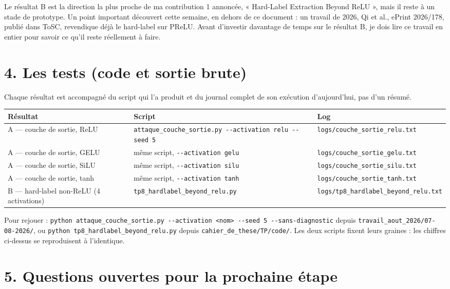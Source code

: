 \documentclass[11pt]{article}
\begin{document}
Le résultat B est la direction la plus proche de ma contribution 1 annoncée, « Hard-Label Extraction Beyond ReLU », mais il reste à un stade de prototype. Un point important découvert cette semaine, en dehors de ce document : un travail de 2026, Qi et al., ePrint 2026/178, publié dans ToSC, revendique déjà le hard-label sur PReLU. Avant d'investir davantage de temps sur le résultat B, je dois lire ce travail en entier pour savoir ce qu'il reste réellement à faire.

\section*{4. Les tests (code et sortie brute)}

Chaque résultat est accompagné du script qui l'a produit et du journal complet de son exécution d'aujourd'hui, pas d'un résumé.

\begin{table}[h]
\centering
\small
\begin{tabular}{p{3.6cm}p{6.2cm}p{3.2cm}}
\toprule
Résultat & Script & Log \\
\midrule
A --- couche de sortie, ReLU & \verb|attaque_couche_sortie.py --activation relu --seed 5| & \texttt{logs/couche\_sortie\_relu.txt} \\
A --- couche de sortie, GELU & même script, \verb|--activation gelu| & \texttt{logs/couche\_sortie\_gelu.txt} \\
A --- couche de sortie, SiLU & même script, \verb|--activation silu| & \texttt{logs/couche\_sortie\_silu.txt} \\
A --- couche de sortie, tanh & même script, \verb|--activation tanh| & \texttt{logs/couche\_sortie\_tanh.txt} \\
B --- hard-label non-ReLU (4 activations) & \texttt{tp8\_hardlabel\_beyond\_relu.py} & \texttt{logs/tp8\_hardlabel\_beyond\_relu.txt} \\
\bottomrule
\end{tabular}
\end{table}

Pour rejouer : \verb|python attaque_couche_sortie.py --activation <nom> --seed 5 --sans-diagnostic| depuis \texttt{travail\_aout\_2026/07-08-2026/}, ou \texttt{python tp8\_hardlabel\_beyond\_relu.py} depuis \texttt{cahier\_de\_these/TP/code/}. Les deux scripts fixent leurs graines : les chiffres ci-dessus se reproduisent à l'identique.

\section*{5. Questions ouvertes pour la prochaine étape}
\end{document}
